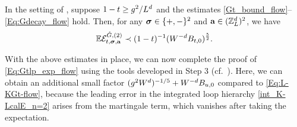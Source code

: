 \begin{lemma}\label{lem:LWterm_EXP}
In the setting of , suppose $1-t\ge g^2/L^{d}$ and the estimates \eqref{Gt_bound_flow}--\eqref{Eq:Gdecay_flow} hold. Then, for any ${\boldsymbol{\sigma}}\in\{+,-\}^2$ and ${\mathbf{a}}\in({\mathbb Z}_L^d)^2$, we have  
\begin{align}\label{eq:ExpLWn=2}
\mathbb{E}\mathcal{E}^{{\mathring G},(2)}_{t, {\boldsymbol{\sigma}}, {\mathbf{a}}}\prec (1-t)^{-1} (W^{-d}B_{t,0})^{\frac{5}{2}}. 
\end{align}
\end{lemma}
With the above estimates in place, we can now complete the proof of \eqref{Eq:Gtlp_exp_flow} using the tools developed in Step 3 (cf.~).
Here, we can obtain an additional small factor $(g^2W^d)^{-1/5}+W^{-d}B_{u,0}$ compared to \eqref{Eq:L-KGt-flow}, because the leading error in the integrated loop hierarchy \eqref{int_K-LcalE_n=2} arises from the martingale term, which vanishes after taking the expectation. 


